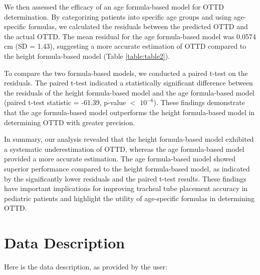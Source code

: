 \documentclass[11pt]{article}
\begin{document}
We then assessed the efficacy of an age formula-based model for OTTD determination. By categorizing patients into specific age groups and using age-specific formulas, we calculated the residuals between the predicted OTTD and the actual OTTD. The mean residual for the age formula-based model was 0.0574 cm (SD = 1.43), suggesting a more accurate estimation of OTTD compared to the height formula-based model (Table {}\ref{table:table2}).

\begin{table}[h]
\caption{Descriptive statistics of Age Formula-based Model residuals.}
\label{table:table2}
\begin{threeparttable}
\renewcommand{\TPTminimum}{\linewidth}
\begin{tablenotes}
\footnotesize
\item 
\end{tablenotes}
\end{threeparttable}
\end{table}


To compare the two formula-based models, we conducted a paired t-test on the residuals. The paired t-test indicated a statistically significant difference between the residuals of the height formula-based model and the age formula-based model (paired t-test statistic = -61.39, p-value $<$ $10^{-6}$). These findings demonstrate that the age formula-based model outperforms the height formula-based model in determining OTTD with greater precision.

In summary, our analysis revealed that the height formula-based model exhibited a systematic underestimation of OTTD, whereas the age formula-based model provided a more accurate estimation. The age formula-based model showed superior performance compared to the height formula-based model, as indicated by the significantly lower residuals and the paired t-test results. These findings have important implications for improving tracheal tube placement accuracy in pediatric patients and highlight the utility of age-specific formulas in determining OTTD.


\clearpage
\appendix

\section{Data Description} \label{sec:data_description} Here is the data description, as provided by the user:
\end{document}
